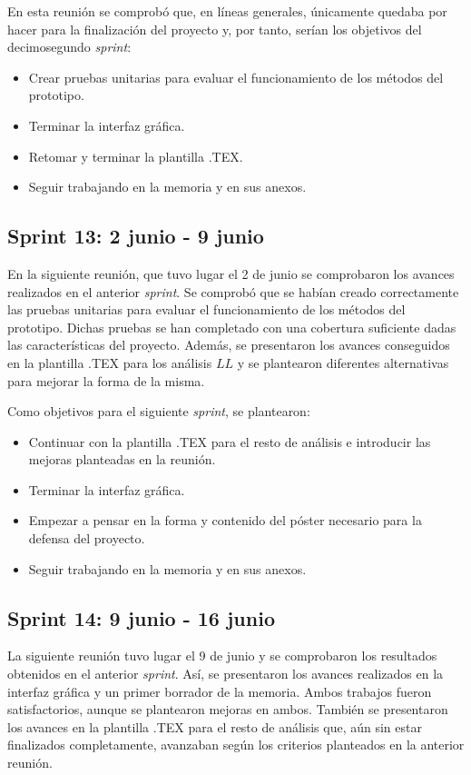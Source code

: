 En esta reunión se comprobó que, en líneas generales, únicamente quedaba por hacer para la finalización del proyecto y, por tanto, serían los objetivos del decimosegundo \textit{sprint}:
\begin{itemize}
\item Crear pruebas unitarias para evaluar el funcionamiento de los métodos del prototipo.
\item Terminar la interfaz gráfica.
\item Retomar y terminar la plantilla .TEX.
\item Seguir trabajando en la memoria y en sus anexos.
\end{itemize}


\subsection{Sprint 13: 2 junio - 9 junio}
En la siguiente reunión, que tuvo lugar el 2 de junio se comprobaron los avances realizados en el anterior \textit{sprint}. Se comprobó que se habían creado correctamente las pruebas unitarias para evaluar el funcionamiento de los métodos del prototipo. Dichas pruebas se han completado con una cobertura suficiente dadas las características del proyecto. Además, se presentaron los avances conseguidos en la plantilla .TEX para los análisis $LL$ y se plantearon diferentes alternativas para mejorar la forma de la misma.

Como objetivos para el siguiente \textit{sprint}, se plantearon:
\begin{itemize}
\item Continuar con la plantilla .TEX para el resto de análisis e introducir las mejoras planteadas en la reunión.
\item Terminar la interfaz gráfica.
\item Empezar a pensar en la forma y contenido del póster necesario para la defensa del proyecto.
\item Seguir trabajando en la memoria y en sus anexos.
\end{itemize}

\subsection{Sprint 14: 9 junio - 16 junio}

La siguiente reunión tuvo lugar el 9 de junio y se comprobaron los resultados obtenidos en el anterior \textit{sprint}. Así, se presentaron los avances realizados en la interfaz gráfica y un primer borrador de la memoria. Ambos trabajos fueron satisfactorios, aunque se plantearon mejoras en ambos. También se presentaron los avances en la plantilla .TEX para el resto de análisis que, aún sin estar finalizados completamente, avanzaban según los criterios planteados en la anterior reunión.

